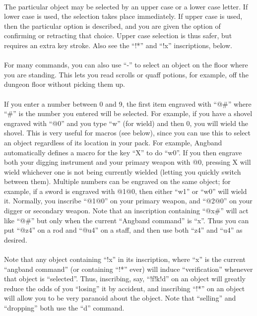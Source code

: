 \paragraph{}The particular object may be selected by an upper case or a lower
case letter. If lower case is used, the selection takes place
immediately. If upper case is used, then the particular option is
described, and you are given the option of confirming or retracting that
choice. Upper case selection is thus safer, but requires an extra key
stroke. Also see the ``!*'' and ``!x'' inscriptions, below.

\paragraph{}For many commands, you can also use ``-'' to select an object on the
floor where you are standing. This lets you read scrolls or quaff
potions, for example, off the dungeon floor without picking them up.

\paragraph{}If you enter a number between 0 and 9, the first item engraved
with ``@\#'' where ``\#'' is the number you entered will be selected. For example,
if you have a shovel engraved with ``@0'' and you type ``w'' (for wield) and
then 0, you will wield the shovel. This is very useful for macros (see
below), since you can use this to select an object regardless of its
location in your pack. For example, Angband automatically defines a macro
for the key ``X'' to do ``w0''. If you then engrave both your digging
instrument and your primary weapon with @0, pressing X will wield
whichever one is not being currently wielded (letting you quickly switch
between them). Multiple numbers can be engraved on the same object; for
example, if a sword is engraved with @1@0, then either ``w1'' or ``w0'' will
wield it. Normally, you inscribe ``@1@0'' on your primary weapon, and
``@2@0'' on your digger or secondary weapon. Note that an inscription
containing ``@x\#'' will act like ``@\#'' but only when the current ``Angband
command'' is ``x''. Thus you can put ``@z4'' on a rod and ``@u4'' on a staff,
and then use both ``z4'' and ``u4'' as desired.

\paragraph{}Note that any object containing ``!x'' in its inscription, where
``x'' is the current ``angband command'' (or containing ``!*'' ever) will induce
``verification'' whenever that object is ``selected''. Thus, inscribing, say,
``!f!k!d'' on an object will greatly reduce the odds of you ``losing'' it by
accident, and inscribing ``!*'' on an object will allow you to be very paranoid
about the object. Note that ``selling'' and ``dropping'' both use the
``d'' command.

